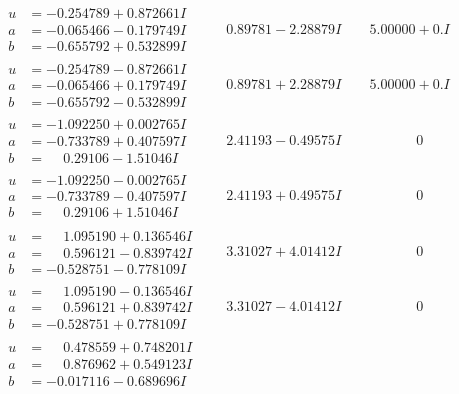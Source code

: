 \documentclass[1p]{elsarticle_modified}
\theoremstyle{definition}
\begin{document}
$$\begin{array}{c|c|c}
\begin{aligned}
u &= -0.254789 + 0.872661 I \\
a &= -0.065466 - 0.179749 I \\
b &= -0.655792 + 0.532899 I\end{aligned}
 & \phantom{-}0.89781 - 2.28879 I & \phantom{-}5.00000 + 0. I\phantom{ +0.000000I} \\ \hline\begin{aligned}
u &= -0.254789 - 0.872661 I \\
a &= -0.065466 + 0.179749 I \\
b &= -0.655792 - 0.532899 I\end{aligned}
 & \phantom{-}0.89781 + 2.28879 I & \phantom{-}5.00000 + 0. I\phantom{ +0.000000I} \\ \hline\begin{aligned}
u &= -1.092250 + 0.002765 I \\
a &= -0.733789 + 0.407597 I \\
b &= \phantom{-}0.29106 - 1.51046 I\end{aligned}
 & \phantom{-}2.41193 - 0.49575 I & \phantom{-0.000000 } 0 \\ \hline\begin{aligned}
u &= -1.092250 - 0.002765 I \\
a &= -0.733789 - 0.407597 I \\
b &= \phantom{-}0.29106 + 1.51046 I\end{aligned}
 & \phantom{-}2.41193 + 0.49575 I & \phantom{-0.000000 } 0 \\ \hline\begin{aligned}
u &= \phantom{-}1.095190 + 0.136546 I \\
a &= \phantom{-}0.596121 - 0.839742 I \\
b &= -0.528751 - 0.778109 I\end{aligned}
 & \phantom{-}3.31027 + 4.01412 I & \phantom{-0.000000 } 0 \\ \hline\begin{aligned}
u &= \phantom{-}1.095190 - 0.136546 I \\
a &= \phantom{-}0.596121 + 0.839742 I \\
b &= -0.528751 + 0.778109 I\end{aligned}
 & \phantom{-}3.31027 - 4.01412 I & \phantom{-0.000000 } 0 \\ \hline\begin{aligned}
u &= \phantom{-}0.478559 + 0.748201 I \\
a &= \phantom{-}0.876962 + 0.549123 I \\
b &= -0.017116 - 0.689696 I\end{aligned}

\end{array}$$
\end{document}

